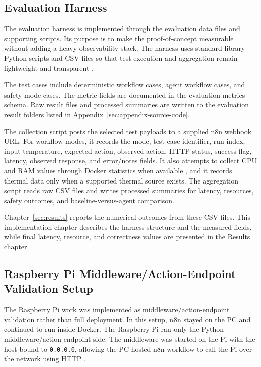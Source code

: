 \subsection{Evaluation Harness}\label{subsec:implementation-evaluation-harness}

The evaluation harness is implemented through the evaluation data files and supporting scripts. Its purpose is to make the proof-of-concept measurable without adding a heavy observability stack. The harness uses standard-library Python scripts and CSV files so that test execution and aggregation remain lightweight and transparent \cite{pythonCsvDocs,csvRfc4180}.

The test cases include deterministic workflow cases, agent workflow cases, and safety-mode cases. The metric fields are documented in the evaluation metrics schema. Raw result files and processed summaries are written to the evaluation result folders listed in Appendix~\ref{sec:appendix-source-code}.

The collection script posts the selected test payloads to a supplied n8n webhook URL. For workflow modes, it records the mode, test case identifier, run index, input temperature, expected action, observed action, HTTP status, success flag, latency, observed response, and error/notes fields. It also attempts to collect CPU and RAM values through Docker statistics when available \cite{dockerStatsDocs}, and it records thermal data only when a supported thermal source exists. The aggregation script reads raw CSV files and writes processed summaries for latency, resources, safety outcomes, and baseline-versus-agent comparison.

Chapter~\ref{sec:results} reports the numerical outcomes from these CSV files. This implementation chapter describes the harness structure and the measured fields, while final latency, resource, and correctness values are presented in the Results chapter.

\subsection{Raspberry Pi Middleware/Action-Endpoint Validation Setup}\label{subsec:implementation-pi}

The Raspberry Pi work was implemented as middleware/action-endpoint validation rather than full deployment. In this setup, n8n stayed on the PC and continued to run inside Docker. The Raspberry Pi ran only the Python middleware/action endpoint side. The middleware was started on the Pi with the host bound to \texttt{0.0.0.0}, allowing the PC-hosted n8n workflow to call the Pi over the network using HTTP \cite{raspberryPiDocs}.

